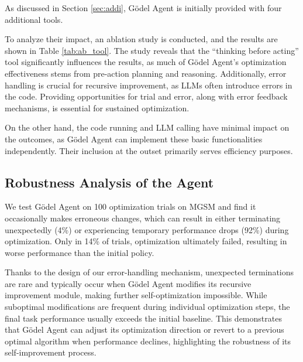 \documentclass[11pt]{article}
\newcommand{\framework}{Gödel Agent\xspace}
\begin{document}
As discussed in Section \ref{sec:addi}, \framework is initially provided with four additional tools.

To analyze their impact, an ablation study is conducted, and the results are shown in Table \ref{tab:ab_tool}. The study reveals that the “thinking before acting” tool significantly influences the results, as much of \framework{}’s optimization effectiveness stems from pre-action planning and reasoning. Additionally, error handling is crucial for recursive improvement, as LLMs often introduce errors in the code. 
Providing opportunities for trial and error, along with error feedback mechanisms, is essential for sustained optimization.

On the other hand, the code running and LLM calling have minimal impact on the outcomes, as \framework can implement these basic functionalities independently. Their inclusion at the outset primarily serves efficiency purposes.

























\subsection{Robustness Analysis of the Agent}

We test \framework on 100 optimization trials on MGSM and find it occasionally makes erroneous changes, which can result in either terminating unexpectedly (4\%) or experiencing temporary performance drops (92\%) during optimization. Only in 14\% of trials, optimization ultimately failed, resulting in worse performance than the initial policy. 


Thanks to the design of our error-handling mechanism, unexpected terminations are rare and typically occur when \framework modifies its recursive improvement module, making further self-optimization impossible. While suboptimal modifications are frequent during individual optimization steps, the final task performance usually exceeds the initial baseline. This demonstrates that \framework can adjust its optimization direction or revert to a previous optimal algorithm when performance declines, highlighting the robustness of its self-improvement process.
\end{document}
